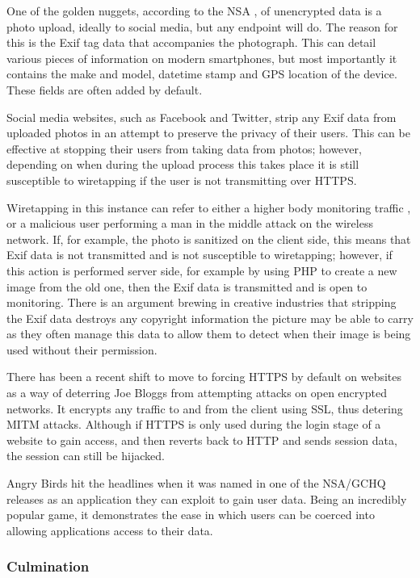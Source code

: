 One of the golden nuggets, according to the NSA \cite{intro:angry_leak}, of unencrypted data is a photo upload, ideally to social media, but any endpoint will do. The reason for this is the Exif \cite{intro:exif_wiki} tag data that accompanies the photograph. This can detail various pieces of information on modern smartphones, but most importantly it contains the make and model, datetime stamp and GPS location \cite{intro:wiki_geotag} of the device. These fields are often added by default. 

Social media websites, such as Facebook and Twitter, strip any Exif data \cite{intro:twitter_exif} from uploaded photos in an attempt to preserve the privacy of their users. This can be effective at stopping their users from taking data from photos; however, depending on when during the upload process this takes place it is still susceptible to wiretapping if the user is not transmitting over HTTPS. 

Wiretapping in this instance can refer to either a higher body monitoring traffic \cite{intro:room_641a}, or a malicious user performing a man in the middle attack on the wireless network. If, for example, the photo is sanitized on the client side, this means that Exif data is not transmitted and is not susceptible to wiretapping; however, if this action is performed server side, for example by using PHP to create a new image from the old one, then the Exif data is transmitted and is open to monitoring. There is an argument brewing in creative industries that stripping the Exif data destroys any copyright information the picture may be able to carry as they often manage this data to allow them to detect when their image is being used without their permission.

There has been a recent shift to move to forcing HTTPS by default on websites as a way of deterring Joe Bloggs from attempting attacks on open encrypted networks. It encrypts any traffic to and from the client using SSL, thus detering MITM attacks. Although if HTTPS is only used during the login stage of a website to gain access, and then reverts back to HTTP and sends session data, the session can still be hijacked.

Angry Birds hit the headlines when it was named in one of the NSA/GCHQ releases as an application they can exploit to gain user data. Being an incredibly popular game, it demonstrates the ease in which users can be coerced into allowing applications access to their data.
\newpage
\subsubsection{Culmination}

